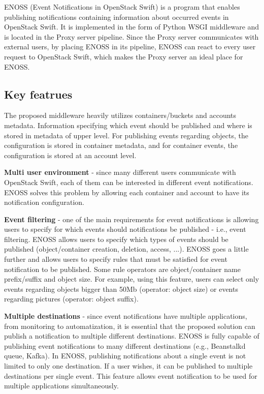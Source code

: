 \documentclass{ExcelAtFIT}
\begin{document}
ENOSS (Event Notifications in OpenStack Swift) is a program that enables publishing notifications containing information about occurred events in OpenStack Swift. It is implemented in the form of Python WSGI middleware and is located in the Proxy server pipeline. Since the Proxy server communicates with external users, by placing ENOSS in its pipeline, ENOSS can react to every user request to OpenStack Swift, which makes the Proxy server an ideal place for ENOSS.

\subsection{Key featrues}
The proposed middleware heavily utilizes containers/buckets and accounts metadata. Information specifying which event should be published and where is stored in metadata of upper level. For publishing events regarding objects, the configuration is stored in container metadata, and for container events, the configuration is stored at an account level.

\textbf{Multi user environment} - since many different users communicate with OpenStack Swift, each of them can be interested in different event notifications. ENOSS solves this problem by allowing each container and account to have its notification configuration.

\textbf{Event filtering} - one of the main requirements for event notifications is allowing users to specify for which events should notifications be published - i.e., event filtering. ENOSS allows users to specify which types of events should be published (object/container creation, deletion, access, ...). ENOSS goes a little further and allows users to specify rules that must be satisfied for event notification to be published. Some rule operators are object/container name prefix/suffix and object size. For example, using this feature, users can select only events regarding objects bigger than 50Mb (operator: object size) or events regarding pictures (operator: object suffix).

\textbf{Multiple destinations} - since event notifications have multiple applications, from monitoring to automatization, it is essential that the proposed solution can publish a notification to multiple different destinations. ENOSS is fully capable of publishing event notifications to many different destinations (e.g., Beanstalkd queue, Kafka). In ENOSS, publishing notifications about a single event is not limited to only one destination. If a user wishes, it can be published to multiple destinations per single event. This feature allows event notification to be used for multiple applications simultaneously.
\end{document}
